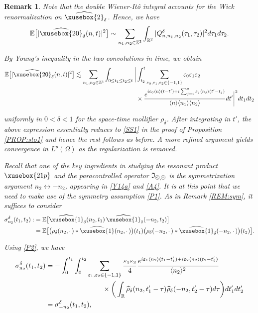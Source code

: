 \documentclass[%
11pt,  reqno]{amsart}
\def\<#1>{\xusebox{#1}}
\newcommand{\pe}{\mathbin{\scaleobj{0.7}{\tikz \draw (0,0) node[shape=circle,draw,inner sep=0pt,minimum size=8.5pt] {\scriptsize  $=$};}}}
\newcommand{\pl}{\mathbin{\scaleobj{0.7}{\tikz \draw (0,0) node[shape=circle,draw,inner sep=0pt,minimum size=8.5pt] {\scriptsize $<$};}}}
\newtheorem{remark}[theorem]{Remark}
\newcommand{\1}{\hspace{0.2mm}\text{I}\hspace{0.2mm}}
\newcommand{\noi}{\noindent}
\newcommand{\Z}{\mathbb{Z}}
\newcommand{\R}{\mathbb{R}}
\newcommand{\E}{\mathbb{E}}
\newcommand{\dl}{\delta}
\newcommand{\eps}{\varepsilon}
\newcommand{\s}{\sigma}
\newcommand{\ft}{\widehat}
\renewcommand{\O}{\Omega}
\newcommand{\les}{\lesssim}
\newcommand{\jb}[1]
{\langle #1 \rangle}
\newcommand{\If}{\mathfrak{I}}
\numberwithin{equation}{section}
\numberwithin{theorem}{section}
\begin{document}
\begin{remark}
\noi
Note that the double Wiener-It\^o integral
accounts for  the Wick renormalization 
on $\ft{\<2>}_\dl $.
Hence, we have 
\[ \E\big[|  \ft{\<20>}_\dl  (n, t) |^2\big] 
\sim \sum_{n_1,n_2\in \Z^3 } 
\int_{\R^2}
 | Q^\dl_{n, n_1, n_2} (\tau_1, \tau_2) |^2 d \tau_1 d \tau_2. \]
 
 
\noi
By Young's inequality in  the two convolutions in time, 
we obtain
\begin{align*}
 \E\big[|  \ft{\<20>}_\dl  (n, t) |^2\big]  
 \les\sum_{n_1, n_2\in \Z^3} 
\int_{0 \leq t_1 \leq t_2 \leq t} 
\bigg| &  \int^t_{t_2}  \sum_{\eps_0, \eps_1, \eps_2\in \{-1, 1\}}
\eps_0 \eps_1 \eps_2 \\
& %
\times \frac{e^{i \eps_0 
\jb{n} (t - t') + i \sum_{j = 1}^2 \eps_j \jb{n_j }
(t' - t_j)}}{\jb{n}\jb{n_1}\jb{n_2}}dt' \bigg|^2 dt_1 d t_2 
\end{align*}

\noi
uniformly in $0 < \dl < 1$
for the space-time mollifier  $\rho_\dl$. 
After integrating in $t'$, 
the above expression essentially reduces to   
  \eqref{SS1} in the proof of Proposition \ref{PROP:sto1}
and hence
the rest follows as before. 
A more refined argument yields 
 convergence in $L^p(\O)$ as the
regularization is removed. 





Recall that 
one of the key ingredients in studying 
the resonant product 
 $\<21p>$
and the paracontrolled operator  $\If_{\pl, \pe}$ 
is
 the symmetrization argument
 $n_2 \leftrightarrow -n_2$, 
  appearing 
in
\eqref{Y14a} 
and 
 \eqref{A4}.
It is at this point that we need to make use of the symmetry assumption
\eqref{P1}.
As in Remark \ref{REM:sym}, 
it suffices to 
consider
\begin{align}
\begin{split}
\s_{n_2}^\dl(t_1, t_2 ) 
: & = \E  \big[  \ft{\<1>}_\dl(n_2, t_1)  \,  \ft{\<1>}_\dl(-n_2, t_2) \big]\\
& =   \E  \big[  
 \big( \rho_\dl (n_2, \cdot\,)*
  \ft{\<1>}(n_2, \cdot\, )\big)(t_1)  
\big(  \rho_\dl (- n_2, \cdot\,)*
    \ft{\<1>}_\dl(-n_2, \cdot\,)\big)(t_2) \big].
\end{split}
\label{P3}
\end{align}

\noi
Using \eqref{P2}, we have
\begin{align*}
\s_{n_2}^\dl(t_1, t_2 ) 
&  = - 
 \int_0^{t_1} 
 \int_0^{t_2}
\sum_{\eps_1, \eps_2 \in \{ -1,  1 \}}
 \frac{\eps_1\eps_2}{4} 
 \frac{e^{i \eps_1 \jb{n_2} (t_1 - t'_1)
 + i \eps_2 \jb{n_2} (t_2 - t'_2)
 }}{\jb{n_2}^2} \\
& \hphantom{XXXXXXXXX}
\times \bigg( \int_\R 
\ft{\rho}_\dl (n_2, t'_1 - \tau)  
  \ft{\rho}_\dl (- n_2, t'_2 - \tau)  
d \tau  
  \bigg)
  dt'_1
 dt'_2\\
 & = 
\s_{- n_2}^\dl(t_1, t_2 ),   
\end{align*}


\end{remark}
\end{document}
